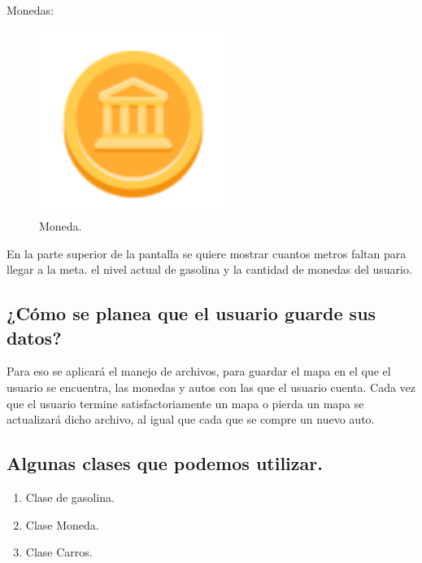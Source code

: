 \documentclass{article}
\begin{document}
Monedas:
\begin{figure}[h]
\includegraphics[width=6cm]{moneda.PNG}
\centering
\caption{Moneda.}
\label{fig:MOneda}
\end{figure}
En la parte superior de la pantalla se quiere mostrar cuantos metros faltan para llegar a la meta. el nivel actual de gasolina y la cantidad de monedas del usuario.
\subsection{¿Cómo se planea que el usuario guarde sus datos?}
Para eso se aplicará el manejo de archivos, para guardar el mapa en el que el usuario se encuentra, las monedas y autos con las que el usuario cuenta. Cada vez que el usuario termine satisfactoriamente un mapa o pierda un mapa se actualizará dicho archivo, al igual que cada que se compre un nuevo auto.
\subsection{Algunas clases que podemos utilizar.}
\begin{enumerate}
    \item Clase de gasolina.
    \item Clase Moneda.
    \item Clase Carros.
\end{enumerate}


\end{document}
